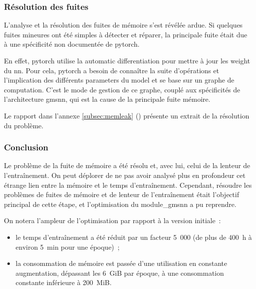 \subsubsection{Résolution des fuites}
L'analyse et la résolution des fuites de mémoire s'est révélée ardue. Si quelques fuites mineures ont été simples à détecter et réparer, la principale fuite était due à une spécificité non documentée de \gls{pytorch}.

En effet, \gls{pytorch} utilise la \gls{automatic differentiation} pour mettre à jour les \gls{weight} du \gls{nn}.
Pour cela, \gls{pytorch} a besoin de connaître la suite d'opérations et l'implication des différents \glspl{parameter} du \gls{model} et se base sur un \og graphe de computation\fg{}.
C'est le mode de gestion de ce graphe, couplé aux spécificités de l'architecture \gls{gmsnn}, qui est la cause de la principale fuite mémoire.

Le rapport dans l'annexe \ref{subsec:memleak} () présente un extrait de la résolution du problème.

\subsubsection{Conclusion}
Le problème de la fuite de mémoire a été résolu et, avec lui, celui de la lenteur de l'entraînement.
On peut déplorer de ne pas avoir analysé plus en profondeur cet étrange lien entre la mémoire et le temps d'entraînement.
Cependant, résoudre les problèmes de fuites de mémoire et de lenteur de l'entraînement était l'objectif principal de cette étape, et l'optimisation du \gls{module_gmsnn} a pu reprendre.

On notera l'ampleur de l'optimisation par rapport à la version initiale~:
\begin{itemize}
	\item le temps d'entraînement a été réduit par un facteur 5~000 (de plus de 400~h à environ 5~min pour une époque)~;
	\item la consommation de mémoire est passée d'une utilisation en constante augmentation, dépassant les 6~GiB par époque, à une consommation constante inférieure à 200~MiB.
\end{itemize}\vspace{1em}